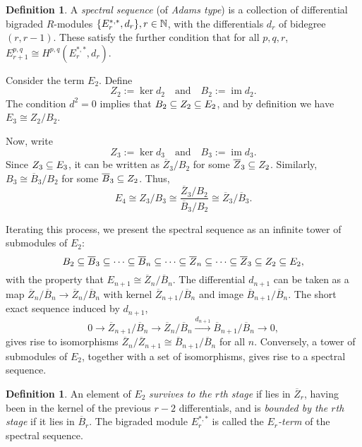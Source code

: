 \documentclass[11pt, titlepage]{article} %
\def\subq{\ensuremath\subseteq}
\def\nat{\ensuremath\mathbb{N}}
\DeclareMathOperator{\im}{im}
\numberwithin{equation}{subsection}
\theoremstyle{plain}
\theoremstyle{definition}
\newtheorem{definition}[theorem]{Definition}
\begin{document}
\begin{definition}
A \textit{spectral sequence} (of \textit{Adams type}) is a collection of differential bigraded \(R\)-modules \(\{E^{*, *}_r, d_r\}, r \in \nat\), with the differentials \(d_r\) of bidegree \((r, r-1)\). These satisfy the further condition that for all \(p, q, r\), \(E^{p, q}_{r+1}\cong H^{p, q}(E_r^{*, *}, d_r)\).
\end{definition}

Consider the term \(E_2\). Define 
\[Z_2:=\ker d_2 \quad \text{and} \quad B_2:=\im d_2.\]
The condition \(d^2=0\) implies that \(B_2\subq Z_2\subq E_2\), and by definition we have \(E_3\cong Z_2/B_2\). 

Now, write 
\[Z_3:=\ker d_3 \quad \text{and} \quad B_3:=\im d_3.\]
Since \(Z_3\subq E_3\), it can be written as \(\overline{Z}_3/B_2\) for some \(\overline{Z}_3\subq Z_2\). Similarly, \(B_3\cong \overline B_3/B_2\) for some \(\overline B_3\subq Z_2\). Thus,
\[E_4\cong Z_3/B_3\cong \frac{\overline Z_3/B_2}{\overline B_3/B_2}\cong \overline Z_3/\overline B_3.\]

Iterating this process, we present the spectral sequence as an infinite tower of submodules of \(E_2\):
\[B_2\subq \overline B_3\subq \cdots \subq \overline B_n\subq \cdots \subq \overline Z_n\subq \cdots \subq \overline Z_3\subq Z_2\subq E_2,\]
with the property that \(E_{n+1}\cong \overline Z_n/\overline B_n\). The differential \(d_{n+1}\) can be taken as a map \(\overline Z_n/\overline B_n\to\overline Z_n/\overline B_n\) with kernel \(\overline Z_{n+1}/\overline B_n\) and image \(\overline B_{n+1}/\overline B_n\). The short exact sequence induced by \(d_{n+1}\),
\[0 \to \overline Z_{n+1}/\overline B_n\to \overline Z_n/\overline B_n \xrightarrow{d_{n+1}} \overline B_{n+1}/\overline{B}_n\to 0,\]
gives rise to isomorphisms \(\overline{Z}_n/\overline{Z}_{n+1}\cong \overline{B}_{n+1}/\overline{B}_n\) for all \(n\). Conversely, a tower of submodules of \(E_2\), together with a set of isomorphisms, gives rise to a spectral sequence. 

\begin{definition}
An element of \(E_2\) \textit{survives to the \(r\)th stage} if lies in \(\overline{Z}_r\), having been in the kernel of the previous \(r-2\) differentials, and is \textit{bounded by the \(r\)th stage} if it lies in \(\overline{B}_r\). The bigraded module \(E_r^{*,*}\) is called the \textit{\(E_r\)-term} of the spectral sequence. 
\end{definition}
\end{document}
